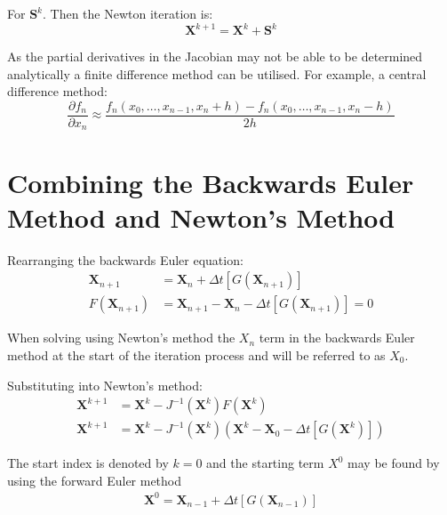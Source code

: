\documentclass[11pt]{article}
\begin{document}
For $\mathbf{S}^k$. Then the Newton iteration is:
\begin{equation}
  \mathbf{X}^{k+1} = \mathbf{X}^k + \mathbf{S}^k
\end{equation}

As the partial derivatives in the Jacobian may not be able to be determined analytically a finite difference method can be utilised.
For example, a central difference method:
\begin{equation}
  \frac{\partial f_n}{\partial x_n} \approx \frac{f_n(x_0,\dots,x_{n-1},x_n+h) - f_n(x_0,\dots,x_{n-1},x_n-h)}{2h}
\end{equation}
\section{Combining the Backwards Euler Method and Newton's Method}
Rearranging the backwards Euler equation:
\begin{subequations}
  \begin{align}
    \mathbf{X}_{n+1} &= \mathbf{X}_n + \Delta t \left[G\left(\mathbf{X}_{n+1}\right)\right] \\
    F(\mathbf{X}_{n+1}) &= \mathbf{X}_{n+1} - \mathbf{X}_n - \Delta t \left[G\left(\mathbf{X}_{n+1}\right)\right] = 0
  \end{align}
\end{subequations}

When solving using Newton's method the $X_n$ term in the backwards Euler method at the start of the iteration process and will be referred to as $X_0$.

Substituting into Newton's method:
\begin{subequations}
  \begin{align}
    \mathbf{X}^{k+1} &= \mathbf{X}^k - J^{-1}(\mathbf{X}^k) F(\mathbf{X}^k) \\
    \mathbf{X}^{k+1} &= \mathbf{X}^k - J^{-1}({\mathbf{X}^k})\left(\mathbf{X}^k - \mathbf{X}_0 - \Delta t \left[G(\mathbf{X}^k)\right]\right)
  \end{align}
\end{subequations}

The start index is denoted by $k=0$ and the starting term $X^0$ may be found by using the forward Euler method
\begin{subequations}
  \begin{align}
    \mathbf{X}^0 = \mathbf{X}_{n-1} + \Delta t \left[G(\mathbf{X}_{n-1})\right]
  \end{align}
\end{subequations}
\end{document}
